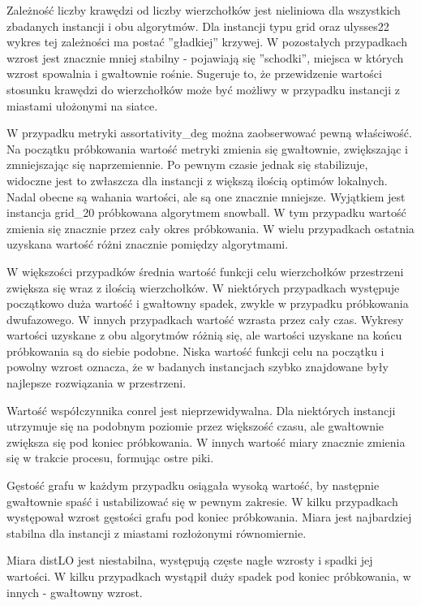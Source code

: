 Zależność liczby krawędzi od liczby wierzchołków jest nieliniowa dla wszystkich zbadanych instancji i obu algorytmów.
Dla instancji typu grid oraz ulysses22 wykres tej zależności ma postać ''gładkiej'' krzywej.
W pozostałych przypadkach wzrost jest znacznie mniej stabilny - pojawiają się ''schodki'', miejsca w których wzrost
spowalnia i gwałtownie rośnie.
Sugeruje to, że przewidzenie wartości stosunku krawędzi do wierzchołków może być możliwy w przypadku
instancji z miastami ułożonymi na siatce.

W przypadku metryki assortativity\_deg można zaobserwować pewną właściwość.
Na początku próbkowania wartość metryki zmienia się gwałtownie, zwiększając i zmniejszając się naprzemiennie.
Po pewnym czasie jednak się stabilizuje, widoczne jest to zwłaszcza dla instancji z większą ilością optimów lokalnych.
Nadal obecne są wahania wartości, ale są one znacznie mniejsze.
Wyjątkiem jest instancja grid\_20 próbkowana algorytmem snowball.
W tym przypadku wartość zmienia się znacznie przez cały okres próbkowania.
W wielu przypadkach ostatnia uzyskana wartość różni znacznie pomiędzy algorytmami.

W większości przypadków średnia wartość funkcji celu wierzchołków przestrzeni zwiększa się wraz z ilością wierzchołków.
W niektórych przypadkach występuje początkowo duża wartość i gwałtowny spadek, zwykle w przypadku próbkowania dwufazowego.
W innych przypadkach wartość wzrasta przez cały czas.
Wykresy wartości uzyskane z obu algorytmów różnią się, ale wartości uzyskane na końcu próbkowania są do siebie podobne.
Niska wartość funkcji celu na początku i powolny wzrost oznacza, że w badanych instancjach szybko znajdowane były
najlepsze rozwiązania w przestrzeni.

Wartość współczynnika conrel jest nieprzewidywalna.
Dla niektórych instancji utrzymuje się na podobnym poziomie przez większość czasu,
ale gwałtownie zwiększa się pod koniec próbkowania.
W innych wartość miary znacznie zmienia się w trakcie procesu, formując ostre piki.

Gęstość grafu w każdym przypadku osiągała wysoką wartość, by następnie gwałtownie spaść i ustabilizować się w pewnym zakresie.
W kilku przypadkach występował wzrost gęstości grafu pod koniec próbkowania.
Miara jest najbardziej stabilna dla instancji z miastami rozłożonymi równomiernie.

Miara distLO jest niestabilna, występują częste nagłe wzrosty i spadki jej wartości.
W kilku przypadkach wystąpił duży spadek pod koniec próbkowania, w innych - gwałtowny wzrost.

